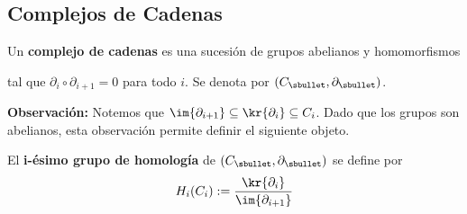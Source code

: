 \documentclass{article}
\begin{document}
\subsection{Complejos de Cadenas}
\begin{dfn}
    Un \textbf{complejo de cadenas} es una sucesión de grupos abelianos y homomorfismos
    
    \vspace{2mm}
    \centerline{
    }
    \vspace{2mm}
    \noindent tal que $\partial_{i}\circ \partial_{i+1}=0$ para todo $i$. Se denota por 
    $(C_{\sbullet},\partial_{\sbullet})$.
\end{dfn}
\noindent\textbf{Observación:} Notemos que $\im{\partial_{i+1}}\subseteq\kr{\partial_{i}}
\subseteq C_{i}$. Dado que los grupos son abelianos, esta observación permite definir el siguiente 
objeto.

\vspace{2mm}
\begin{dfn}
    El \textbf{i-ésimo grupo de homología} de $(C_{\sbullet},\partial_{\sbullet})$ se define por
    \begin{equation*}
        H_{i}(C_{i}):=\frac{\kr{\partial_{i}}}{\im{\partial_{i+1}}}
    \end{equation*}
\end{dfn}
\end{document}
